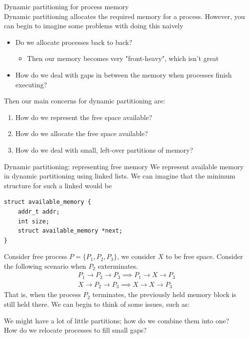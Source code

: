 \documentclass[journal, letterpaper]{IEEEtran}
\begin{document}
\begin{theory}{Dynamic partitioning for process memory} \\
    Dynamic partitioning allocates the required memory for a process. However, you can begin to imagine some problems with doing this naively
    \begin{itemize}
        \item Do we allocate processes back to back?
        \begin{itemize}
            \item Then our memory becomes very "front-heavy", which isn't great
        \end{itemize}
        \item How do we deal with gaps in between the memory when processes finish executing?
    \end{itemize}
    Then our main concerns for dynamic partitioning are:
    \begin{enumerate}
        \item How do we represent the free space available?
        \item How do we allocate the free space available?
        \item How do we deal with small, left-over partitions of memory?
    \end{enumerate}
\end{theory}
\begin{theory}{Dynamic partitioning: representing free memory}
    We represent available memory in dynamic partitioning using linked lists. We can 
    imagine that the minimum structure for such a linked would be
\begin{verbatim}
struct available_memory {
    addr_t addr;
    int size;
    struct available_memory *next;
}
\end{verbatim}
    Consider free process $P = \{P_1, P_2, P_3\}$, we consider $X$ to be free space. Consider the following scenario when $P_2$ exterminates.
    \begin{gather*}
        P_1 \to P_2 \to P_3 \implies P_1 \to X \to P_3 \\
        X \to P_2 \to P_3 \implies X \to X \to P_3
    \end{gather*}
    That is, when the process $P_2$ terminates, the previously held memory block 
    is still held there. We can begin to think of some issues, such as:
    \begin{center}
        We might have a lot of little partitions; how do we combine them into one?\\ How do we relocate processes to fill small gaps?
    \end{center}
\end{theory}
\end{document}

